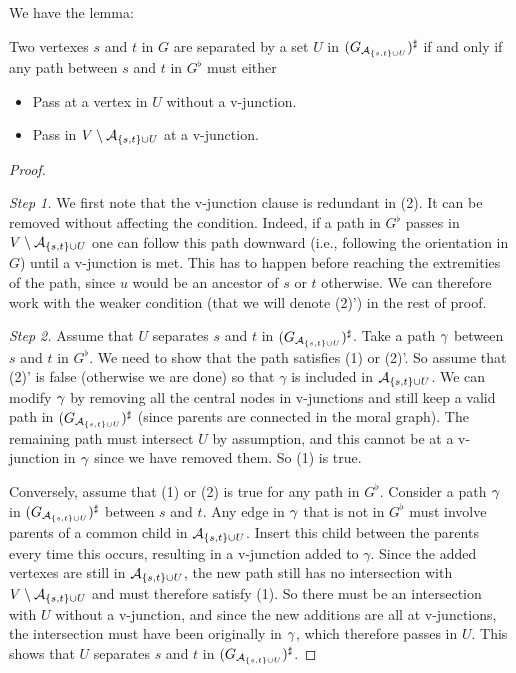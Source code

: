 We have the lemma:
\begin{lemma}
\label{lem:d.sep}
Two vertexes $s$ and $t$ in $G$ are
separated by a set $U$ in $(G_{{\mathcal A}_{\{s,t\}\cup U}})^\sharp$ if and
only if any path between $s$ and $t$ in $G^\flat$ must either
\begin{itemize}
\item[(1)] Pass at a vertex in $U$ without a v-junction.
\item[(2)] Pass in  $V \setminus {\mathcal A}_{\{s,t\}\cup U}$ at a v-junction.
\end{itemize}
\end{lemma}
\begin{proof}
\

{\noindent \it Step 1.} We first note that the v-junction clause is
redundant in (2). It can be removed without affecting the
condition. Indeed, if a path in $G^\flat$ passes in $V \setminus
{\mathcal A}_{\{s,t\}\cup U}$ one can follow this path downward (i.e.,
following the orientation in $G$) until a v-junction is met. This has
to happen before reaching the extremities of the path, since $u$ would
be an ancestor of $s$ or $t$ otherwise.  We can therefore work with the weaker
condition (that we will denote (2)')
in the rest of proof.

\bigskip
{\noindent \em Step 2.} 
Assume that $U$ separates $s$ and $t$ in $(G_{{\mathcal A}_{\{s,t\}\cup
U}})^\sharp$. Take a path $\gamma$ between $s$ and $t$ in $G^\flat$. We need to
show that the path satisfies (1) or (2)'. So assume that (2)' is false
(otherwise we are done) so that $\gamma$ is included in
${\mathcal A}_{\{s,t\}\cup U}$. We can modify $\gamma$ by
removing all the central nodes in v-junctions and still keep a valid path in $(G_{{\mathcal A}_{\{s,t\}\cup
U}})^\sharp$ (since parents are connected in the moral graph). The remaining path must intersect $U$ by assumption, and
this cannot be at a v-junction in $\gamma$ since we have removed them. So
(1) is true.

\bigskip
{}
Conversely, assume that (1) or (2) is true for any path in
$G^\flat$. Consider a path $\gamma$ in $(G_{{\mathcal A}_{\{s,t\}\cup U}})^\sharp$
between $s$ and $t$. Any edge in $\gamma$ that is not in $G^\flat$ must
involve parents of a common child in ${\mathcal A}_{\{s,t\}\cup
  U}$. Insert this child between the parents every time this occurs,
resulting in a v-junction added to $\gamma$. Since the added
vertexes are still in ${\mathcal A}_{\{s,t\}\cup
  U}$, the new path still has no intersection with $V\setminus {\mathcal A}_{\{s,t\}\cup
  U}$ and must therefore satisfy (1). So there must be an intersection
with $U$ without a v-junction, and since the new additions are all
at v-junctions, the intersection must have been originally in $\gamma$,
which therefore passes in $U$. This shows that $U$ separates $s$ and
$t$ in $(G_{{\mathcal A}_{\{s,t\}\cup U}})^\sharp$.
\end{proof}

